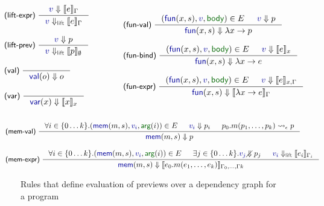 \documentclass[acmsmall,anonymous,fleqn]{acmart}\settopmatter{printfolios=false,printccs=false,printacmref=false}
\theoremstyle{plain}
\theoremstyle{definition}
\newcommand{\ident}[1]{\textnormal{\textcolor{idclr}{\sffamily #1}}}
\newcommand{\bndclr}[1]{\textcolor{kvdclr}{#1}}
\newcommand{\bnd}[1]{\textnormal{\textcolor{kvdclr}{\sffamily #1}}}
\newcommand{\blbl}[1]{\textnormal{\textcolor{numclr}{\sffamily #1}}}
\newcommand{\rname}[1]{{\sffamily\small(#1)}}
\begin{document}
\begin{figure}[b]
\begin{equation*}
\hspace{-2.5em}
\begin{array}{l}
\inference[\rname{lift-expr}~]
  {\bndclr{v} \Downarrow \llbracket e \rrbracket_\Gamma}
  {\bndclr{v} \Downarrow_{\ident{lift}} \llbracket e \rrbracket_\Gamma}
\\
\\
\inference[\rname{lift-prev}~]
  {\bndclr{v} \Downarrow p}
  {\bndclr{v} \Downarrow_{\ident{lift}} \llbracket p \rrbracket_\emptyset}
\\
\\
\inference[\rname{val}~]
  {~}
  {\bnd{val}(o) \Downarrow o }
\\
\\
\inference[\rname{var}~]
  {~}
  {\bnd{var}(x) \Downarrow \llbracket x \rrbracket_x}
  \\[0.5em]~
\end{array}
\qquad\quad
\begin{array}{l}
\inference[\rname{fun-val}~]
  { (\bnd{fun}(x, s), \bndclr{v}, \blbl{body}) \in E & \bndclr{v} \Downarrow p }
  { \bnd{fun}(x, s) \Downarrow \lambda x\rightarrow p }
\\
\\
\inference[\rname{fun-bind}~]
  { (\bnd{fun}(x, s), \bndclr{v}, \blbl{body}) \in E & \bndclr{v} \Downarrow \llbracket e \rrbracket_{x} }
  { \bnd{fun}(x, s) \Downarrow \lambda x\rightarrow e }
\\
\\
\inference[\rname{fun-expr}~]
  { (\bnd{fun}(x, s), \bndclr{v}, \blbl{body}) \in E & \bndclr{v} \Downarrow \llbracket e \rrbracket_{x,\Gamma} }
  { \bnd{fun}(x, s) \Downarrow \llbracket \lambda x\rightarrow e \rrbracket_\Gamma }
\\[0.5em]~
\end{array}
\end{equation*}
\begin{equation*}
\hspace{-2.5em}
\begin{array}{l}
\inference[\rname{mem-val}~]
  { \forall i\in\{0\ldots k\}.(\bnd{mem}(m, s), \bndclr{v_i}, \blbl{arg}(i)) \in E & \bndclr{v_i} \Downarrow p_i
    & p_0.m(p_1, \ldots, p_k) \rightsquigarrow_\epsilon p }
  { \bnd{mem}(m, s) \Downarrow p }
\\
\\
\inference[\rname{mem-expr}~]
  { \forall i\in\{0\ldots k\}.(\bnd{mem}(m, s), \bndclr{v_i}, \blbl{arg}(i)) \in E & \exists j\in\{0\ldots k\}.\bndclr{v_j}\diagup\hspace{-1em}\Downarrow p_j
   & \bndclr{v_i} \Downarrow_{\ident{lift}} \llbracket e_i \rrbracket_{\Gamma_i}  }
  { \bnd{mem}(m, s) \Downarrow \llbracket e_0.m(e_1, \ldots, e_k) \rrbracket_{\Gamma_0,\ldots,\Gamma k} }
\\
\end{array}
\end{equation*}

\caption{Rules that define evaluation of previews over a dependency graph for a program}
\label{fig:eval}
\end{figure}
\end{document}
